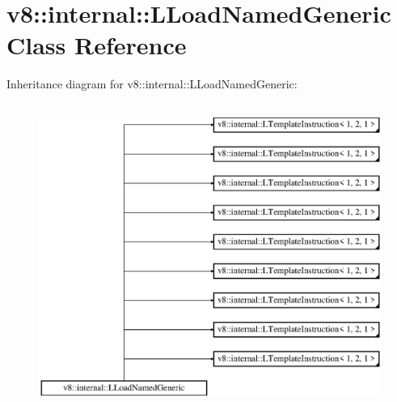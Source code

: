 \hypertarget{classv8_1_1internal_1_1_l_load_named_generic}{}\section{v8\+:\+:internal\+:\+:L\+Load\+Named\+Generic Class Reference}
\label{classv8_1_1internal_1_1_l_load_named_generic}
Inheritance diagram for v8\+:\+:internal\+:\+:L\+Load\+Named\+Generic\+:\begin{figure}[H]
\begin{center}
\leavevmode
\includegraphics[height=10.000000cm]{classv8_1_1internal_1_1_l_load_named_generic}
\end{center}
\end{figure}
